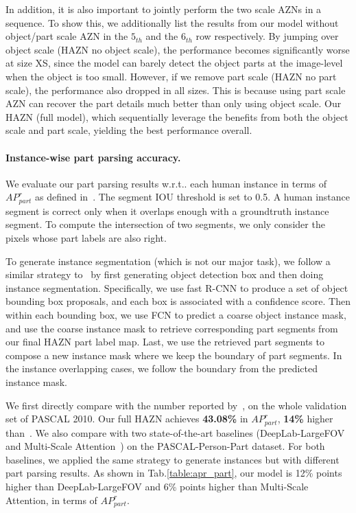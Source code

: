 \documentclass[runningheads]{llncs}
\makeatletter
\DeclareRobustCommand\onedot{\futurelet\@let@token\@onedot}
\def\@onedot{\ifx\@let@token.\else.\null\fi\xspace}
\def\wrt{w.r.t\onedot} \def\dof{d.o.f\onedot}
\makeatother
\begin{document}
In addition, it is also important to jointly perform the two scale AZNs in a sequence. To show this, we additionally list the results from our model without object/part scale AZN in the $5_{th}$ and the $6_{th}$ row respectively. 
By jumping over object scale (HAZN no object scale), the performance becomes significantly worse at size XS, since the model can barely detect the object parts at the image-level when the object is too small.  However, if we remove part scale (HAZN no part scale), the performance also dropped in all sizes. This is because using part scale AZN can recover the part details much better than only using object scale. Our HAZN (full model), which sequentially leverage the benefits from both the object scale and part scale, yielding the best performance overall.

\paragraph{Instance-wise part parsing accuracy.} We evaluate our part parsing results \wrt each human instance in terms of $AP^r_{part}$ as defined in~\cite{hariharan2014hypercolumns}. The segment IOU threshold is set to 0.5. A human instance segment is correct only when it overlaps enough with a groundtruth instance segment. To compute the intersection of two segments, we only consider the pixels whose part labels are also right. 

To generate instance segmentation (which is not our major task), we follow a similar strategy to~\cite{hariharan2014hypercolumns} by first generating object detection box and then doing instance segmentation. Specifically, we use fast R-CNN to produce a set of object bounding box proposals, and each box is associated with a confidence score. Then within each bounding box, we use FCN to predict a coarse object instance mask, and use the coarse instance mask to retrieve corresponding part segments from our final HAZN part label map. Last, we use the retrieved part segments to compose a new instance mask where we keep the boundary of part segments. In the instance overlapping cases, we follow the boundary from the predicted instance mask.

We first directly compare with the number reported by~\cite{hariharan2014hypercolumns}, on the whole validation set of PASCAL 2010. Our full HAZN achieves \textbf{43.08\%} in $AP^r_{part}$, \textbf{14\%} higher than~\cite{hariharan2014hypercolumns}. We also compare with two state-of-the-art baselines (DeepLab-LargeFOV~\cite{chen2014semantic} and Multi-Scale Attention~\cite{chen2015attention}) on the PASCAL-Person-Part dataset. For both baselines, we applied the same strategy to generate instances but with different part parsing results. As shown in Tab.\ref{table:apr_part}, our model is 12\% points higher than DeepLab-LargeFOV and 6\% points higher than Multi-Scale Attention, in terms of $AP^r_{part}$. 
\end{document}
